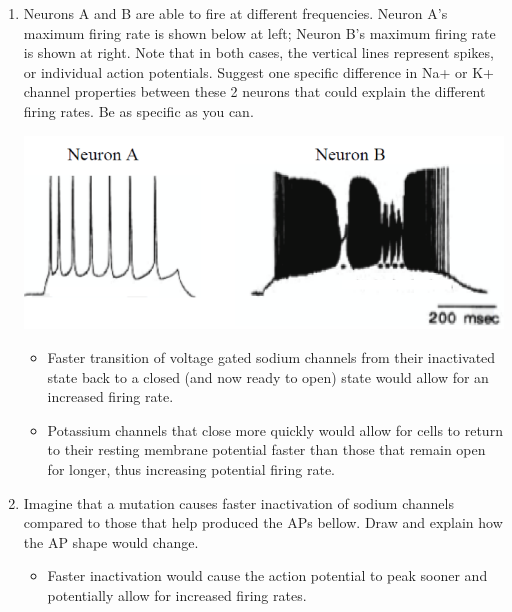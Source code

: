 \documentclass[plain,worksheet]{inVerba-notes}
\begin{document}
\begin{enumerate}[resume]
    \item Neurons A and B are able to fire at different frequencies. Neuron A’s maximum firing rate is shown below at left; Neuron B’s maximum firing rate is shown at right. Note that in both cases, the vertical lines represent spikes, or individual action potentials. Suggest one specific difference in Na+ or K+ channel properties between these 2 neurons that could explain the different firing rates. Be as specific as you can.
    \bigskip
    \begin{center}
        \includegraphics[scale=0.4]{graphs/firing-rate.png}
    \end{center}
    \begin{itemize}
        \item Faster transition of voltage gated sodium channels from their inactivated state back to a closed (and now ready to open) state would allow for an increased firing rate. 
        \item Potassium channels that close more quickly would allow for cells to return to their resting membrane potential faster than those that remain open for longer, thus increasing potential firing rate.
    \end{itemize}

    \item Imagine that a mutation causes faster inactivation of sodium channels compared to those that help produced the APs bellow. Draw and explain how the AP shape would change.

    \bigskip
    \begin{center}
        
    \end{center}

    \begin{itemize}
        \item Faster inactivation would cause the action potential to peak sooner and potentially allow for increased firing rates.
    \end{itemize}
    

\end{enumerate}
\end{document}
